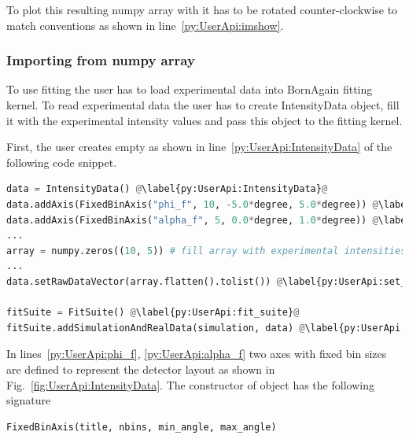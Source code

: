 To plot this resulting numpy array with  it has to be rotated counter-clockwise
to match  conventions as shown in line~\ref{py:UserApi:imshow}.





\subsubsection{Importing from numpy array}

To use fitting the user has to load experimental data into BornAgain fitting kernel.
To read experimental data the user has to create
IntensityData object, fill it with the experimental  intensity values and pass
this object to the fitting kernel.

First, the user creates empty  as shown
in line~\ref{py:UserApi:IntensityData} of the following code snippet.
\begin{lstlisting}[language=python, style=eclipseboxed]
data = IntensityData() @\label{py:UserApi:IntensityData}@
data.addAxis(FixedBinAxis("phi_f", 10, -5.0*degree, 5.0*degree)) @\label{py:UserApi:phi_f}@
data.addAxis(FixedBinAxis("alpha_f", 5, 0.0*degree, 1.0*degree)) @\label{py:UserApi:alpha_f}@
...
array = numpy.zeros((10, 5)) # fill array with experimental intensities @\label{py:UserApi:create_array}@
...
data.setRawDataVector(array.flatten().tolist()) @\label{py:UserApi:set_raw}@

fitSuite = FitSuite() @\label{py:UserApi:fit_suite}@
fitSuite.addSimulationAndRealData(simulation, data) @\label{py:UserApi:add_real_data}@
\end{lstlisting}

In lines~\ref{py:UserApi:phi_f}, \ref{py:UserApi:alpha_f} two axes with fixed bin sizes
are defined to represent the detector layout as shown in Fig.~\ref{fig:UserApi:IntensityData}.
The constructor of  object has the following signature

\begin{lstlisting}[language=python, style=eclipse,numbers=none]
FixedBinAxis(title, nbins, min_angle, max_angle)
\end{lstlisting}

